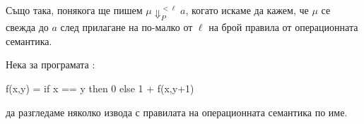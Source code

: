 \begin{description}
  \begin{figure}[h!]
    \begin{prooftree}
    \end{prooftree}
  \end{figure}
\item
  \begin{figure}[h!]
    \begin{prooftree}
    \end{prooftree}
  \end{figure}
\end{description}

\newpage

Също така, понякога ще пишем $\mu \Downarrow^{<\ell}_P a$, когато искаме да кажем, че
$\mu$ се свежда до $a$ след прилагане на по-малко от $\ell$ на брой правила от операционната семантика.



\begin{example}
  Нека за програмата :
  \begin{haskellcode}
    f(x,y) = if x == y then 0 else 1 + f(x,y+1)
  \end{haskellcode}
  да разгледаме няколко извода с правилата на операционната семантика по име.
\end{example}


